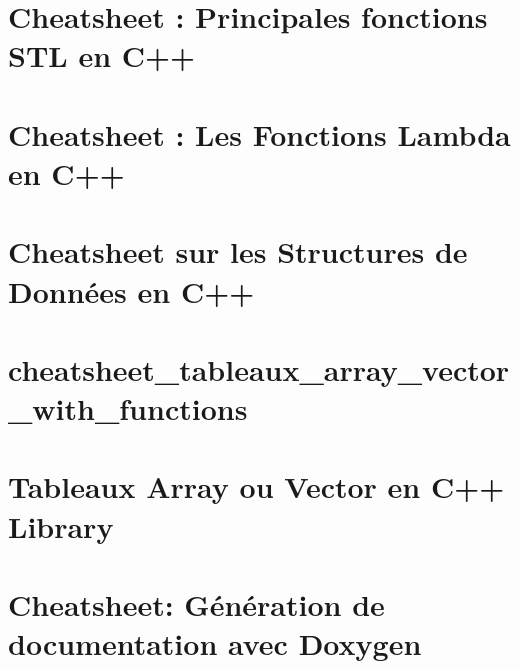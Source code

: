 \documentclass[twoside]{book}
\newcommand{\+}{\discretionary{\mbox{\scriptsize$\hookleftarrow$}}{}{}}
\begin{document}
\chapter{Cheatsheet \+: Principales fonctions S\+TL en C++}
\label{md_prog_C_vers_C_09_09_cheatsheet_cheatsheet_fonctions_stl_cpp}

\chapter{Cheatsheet \+: Les Fonctions Lambda en C++}
\label{md_prog_C_vers_C_09_09_cheatsheet_cheatsheet_lambdas_cpp}

\chapter{Cheatsheet sur les Structures de Données en C++}
\label{md_prog_C_vers_C_09_09_cheatsheet_cheatsheet_structures_donnees_cpp}

\chapter{cheatsheet\+\_\+tableaux\+\_\+array\+\_\+vector\+\_\+with\+\_\+functions}
\label{md_prog_C_vers_C_09_09_cheatsheet_cheatsheet_tableaux_array_vector_with_functions}

\chapter{Tableaux Array ou Vector en C++ Library}
\label{md_prog_C_vers_C_09_09_cheatsheet_cheatsheet_tableaux_arrays_vectors}

\chapter{Cheatsheet\+: Génération de documentation avec Doxygen}
\label{md_prog_C_vers_C_09_09_cheatsheet_Doxygen_Cheatsheet}

\end{document}
